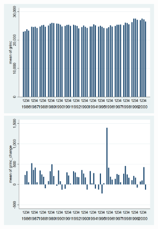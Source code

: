 \documentclass[12pt,a4paper]{article}
\begin{document}
\begin{center}
\includegraphics[width=8cm]{graphs/grinc_quarterly.png}
\includegraphics[width=8cm]{graphs/grinc_change_quarterly.png}\\
\end{center}
\end{document}
